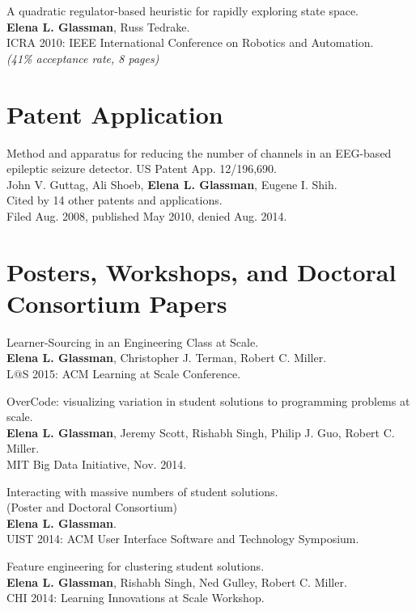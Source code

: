 \documentclass[margin]{res}
\begin{document}
\begin{resume}
A quadratic regulator-based heuristic for rapidly exploring state space.\\
{\bf Elena L. Glassman}, Russ Tedrake.\\
ICRA 2010: IEEE International Conference on Robotics and Automation.\\ 
{\it (41\% acceptance rate, 8 pages)}


\section{Patent Application}

Method and apparatus for reducing the number of channels in an EEG-based epileptic seizure detector. US Patent App. 12/196,690.\\ 
John V. Guttag, Ali Shoeb, {\bf Elena L. Glassman}, Eugene I. Shih.\\ Cited by 14 other patents and applications.\\Filed Aug. 2008, published May 2010, denied Aug. 2014.


\section{Posters, Workshops, and Doctoral Consortium Papers}

Learner-Sourcing in an Engineering Class at Scale.\\
{\bf Elena L. Glassman}, Christopher J. Terman, Robert C. Miller.\\
L$@$S 2015: ACM Learning at Scale Conference.

OverCode: visualizing variation in student solutions to programming problems at scale.\\
{\bf Elena L. Glassman}, Jeremy Scott, Rishabh Singh, Philip J. Guo, Robert C. Miller. \\ 
MIT Big Data Initiative, Nov. 2014.

Interacting with massive numbers of student solutions.\\ (Poster and Doctoral Consortium)\\
{\bf Elena L. Glassman}.\\ 
UIST 2014: ACM User Interface Software and Technology Symposium.

Feature engineering for clustering student solutions.\\
{\bf Elena L. Glassman}, Rishabh Singh, Ned Gulley, Robert C. Miller.\\
CHI 2014: Learning Innovations at Scale Workshop.


\end{resume}
\end{document}
